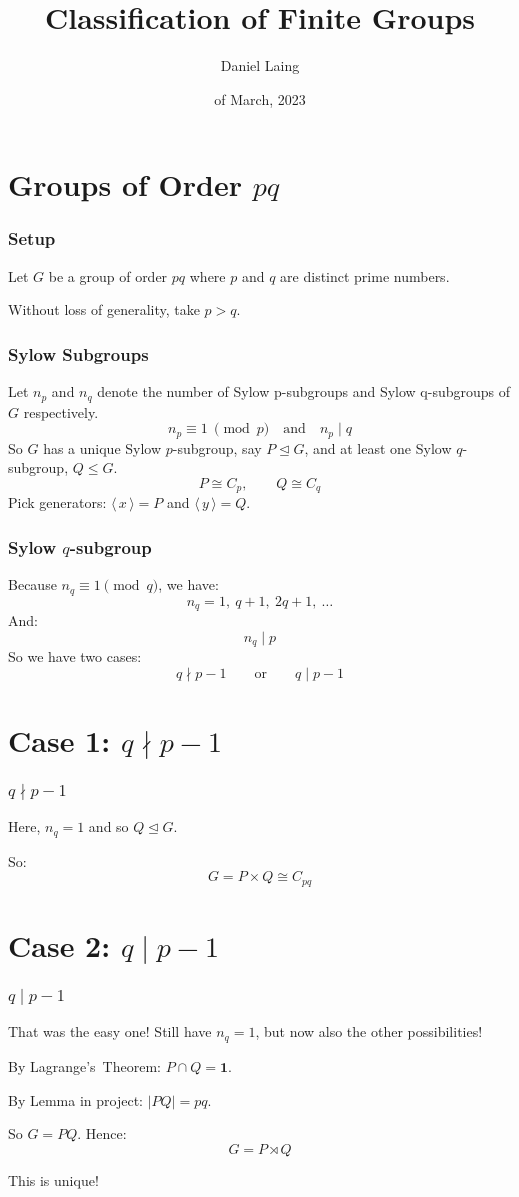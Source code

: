 \documentclass[12pt]{beamer}
\title{Classification of Finite Groups}
\author{Daniel Laing}
\date{\nth{23} of March, 2023}
\institute{\textit{MT4599}}
\newcommand{\nrmsgp}{\unlhd}
\newcommand{\gen}[1]{\langle\,#1\,\rangle}
\begin{document}
\frame{\titlepage}

\section{Groups of Order \(pq\)}

\begin{frame}
\frametitle{Setup}
Let \(G\) be a group of order \(pq\) where \(p\) and \(q\) are distinct prime numbers.

Without loss of generality, take \(p > q\).
\end{frame}

\begin{frame}
\frametitle{Sylow Subgroups}
Let \(n_p\) and \(n_q\) denote the number of Sylow p-subgroups and Sylow q-subgroups of \(G\) respectively.
\[n_p \equiv 1 \ \pmod{p} \quad \text{and} \quad n_p \mid q\]
So \(G\) has a unique Sylow \(p\)-subgroup, say \(P \nrmsgp G\), and at least one Sylow \(q\)-subgroup, \(Q \leqslant
    G\).
\[ P \cong C_{p}, \qquad Q \cong C_{q} \]
Pick generators: \(\gen{x} = P\) and \(\gen{y} = Q\).
\end{frame}

\begin{frame}
\frametitle{Sylow \(q\)-subgroup}
Because \(n_{q} \equiv 1 \pmod{q}\), we have:
\[ n_{q} = 1,\ q + 1,\ 2q + 1,\ \ldots \]
And:
\[ n_q \mid p\]
So we have two cases:
\[ q \nmid p-1 \qquad \text{or} \qquad q \mid p-1 \]
\end{frame}

\section{Case 1: \(q \nmid p-1\)}

\begin{frame}
\frametitle{\(q \nmid p-1\)}
Here, \(n_{q} = 1\) and so \(Q \nrmsgp G\).

So:
\[ G = P \times Q \cong C_{pq} \]
\end{frame}

\section{Case 2: \(q \mid p-1\)}
\begin{frame}
\frametitle{\(q \mid p-1\)}
That was the easy one!
Still have \(n_q = 1\), but now also the other possibilities!

By Lagrange's~Theorem: \(P \cap Q = \bm{1}\).

By Lemma in project: \(|PQ| = pq\).

So \(G = PQ\).
Hence:
\[ G = P \rtimes Q \]

This is unique!
\end{frame}
\end{document}
